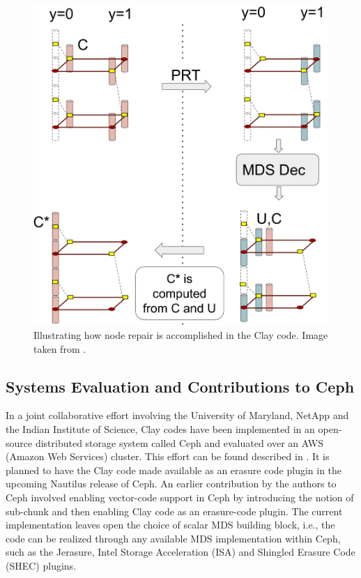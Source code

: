 \begin{multicols}{2}
\begin{figure}[H]
\centering
\includegraphics{src/Figures/chap4/repair_flow42.jpg}  
\caption{Illustrating how node repair is accomplished in the Clay code. Image taken from \cite{VajhaFAST18}.}  \label{fig:repair_flow42}    
\end{figure}

 \subsection{Systems Evaluation and Contributions to Ceph}

\vskip -3pt

 In  a joint collaborative effort involving the University of Maryland, NetApp and the Indian Institute of Science, Clay codes have been implemented in an open-source distributed storage system called Ceph \cite{ceph} and evaluated over an AWS (Amazon Web Services) cluster. This effort can be found described in \cite{VajhaFAST18}.  It is planned to have the Clay code made available as an erasure code plugin in the upcoming Nautilus release \cite{nautilusceph2} of Ceph.  An earlier contribution by the authors to Ceph involved enabling vector-code support in Ceph by introducing the notion of sub-chunk and then enabling Clay code as an erasure-code plugin. The current implementation leaves open the choice of scalar MDS building block, i.e., the code can be realized through any available MDS implementation within Ceph, such as the Jerasure, Intel Storage Acceleration (ISA) and Shingled Erasure Code (SHEC) plugins.\\[-20pt]


\end{multicols}

